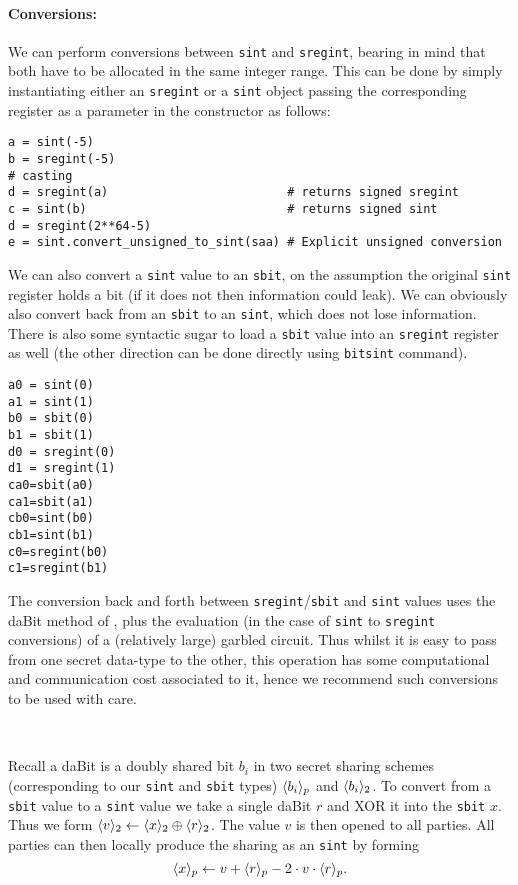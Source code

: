 \paragraph{Conversions:}
We can perform conversions between \verb|sint| and \verb|sregint|, bearing in mind that both have to be allocated in the same integer range. This can be done by simply instantiating either an \verb|sregint| or a
\verb|sint| object passing the corresponding register as a parameter in the constructor as follows:
\begin{lstlisting}
a = sint(-5)
b = sregint(-5)
# casting
d = sregint(a)                         # returns signed sregint
c = sint(b)                            # returns signed sint
d = sregint(2**64-5)
e = sint.convert_unsigned_to_sint(saa) # Explicit unsigned conversion
\end{lstlisting}
We can also convert a \verb|sint| value to an \verb|sbit|, on the assumption the
original \verb|sint| register holds a bit (if it does not then information
could leak).
We can obviously also convert back from an \verb|sbit| to an \verb|sint|,
which does not lose information.
There is also some syntactic sugar to load a \verb|sbit| value into an
\verb|sregint| register as well (the other direction can be done directly
using \verb|bitsint| command).
\begin{lstlisting}
a0 = sint(0)
a1 = sint(1)
b0 = sbit(0)
b1 = sbit(1)
d0 = sregint(0)
d1 = sregint(1)
ca0=sbit(a0)
ca1=sbit(a1)
cb0=sint(b0)
cb1=sint(b1)
c0=sregint(b0)
c1=sregint(b1)
\end{lstlisting}
The conversion back and forth between \verb|sregint|/\verb|sbit| and \verb|sint| values uses the
daBit method of \cite{daBitPaper}, plus the evaluation (in the case of \verb|sint| to
\verb|sregint| conversions) of a (relatively large) garbled circuit.
Thus whilst it is easy to pass from one secret data-type to the other,
this operation has some computational and communication cost associated to it, hence
we recommend such conversions to be used with care.


~

Recall a daBit is a doubly shared bit $b_i$ in two secret sharing
schemes (corresponding to our \verb|sint| and \verb|sbit| types)
$\langle b_i \rangle_p$ and $\langle b_i \rangle_2$.
To convert from a \verb|sbit| value to a \verb|sint| value we take
a single daBit $r$ and XOR it into the \verb|sbit| $x$.
Thus we form $\langle v \rangle_2 \leftarrow \langle x \rangle_2 \oplus \langle r \rangle_2$.
The value $v$ is then opened to all parties.
All parties can then locally produce the sharing as an \verb|sint|
by forming
\[  \langle x \rangle_p \leftarrow v + \langle r \rangle_p - 2 \cdot v \cdot \langle r \rangle_p. \]


